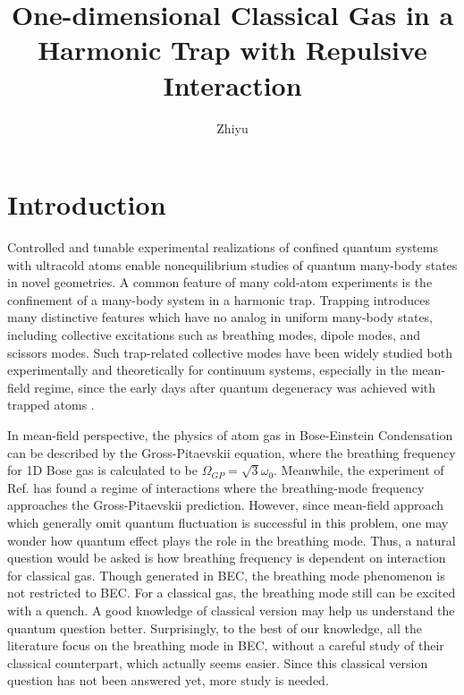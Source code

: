 \documentclass[aps,pre,twocolumn,groupedaddress]{revtex4-1}
\begin{document}
 \title{One-dimensional Classical Gas in a Harmonic Trap with Repulsive Interaction}
 \author{Zhiyu}
 
 
\begin{abstract}
\end{abstract}
 \maketitle
\section{Introduction}
Controlled and tunable experimental realizations of confined quantum systems with ultracold atoms enable nonequilibrium studies of quantum many-body states in novel geometries. A common feature of many cold-atom experiments is the confinement of a many-body system in a harmonic trap. Trapping introduces many distinctive features which have no analog in uniform many-body states, including collective excitations such as breathing modes, dipole modes, and scissors modes. Such trap-related collective modes have been widely studied both experimentally and theoretically for continuum systems, especially in the mean-field regime, since the early days after quantum degeneracy was achieved with trapped atoms \cite{Dalfovo1997}\cite{Jin1996}.

In mean-field perspective, the physics of atom gas in Bose-Einstein Condensation can be described by the Gross-Pitaevskii equation\cite{Dalfovo1999}\cite{Stringari1996}, where the breathing frequency for 1D Bose gas is calculated to be $\Omega_{GP}=\sqrt{3}\omega_0$. Meanwhile, the experiment of Ref.\cite{Haller2009} has found a regime of interactions where the breathing-mode frequency approaches the Gross-Pitaevskii prediction. However, since mean-field approach which generally omit quantum fluctuation is successful in this problem, one may wonder how quantum effect plays the role in the breathing mode. Thus, a natural question would be asked is how breathing frequency is dependent on interaction for classical gas. Though generated in BEC, the breathing mode phenomenon is not restricted to BEC. For a classical gas, the breathing mode still can be excited with a quench. A good knowledge of classical version may help us understand the quantum question better. Surprisingly,  to the best of our knowledge, all the literature focus on the breathing mode in BEC, without a careful study of their classical counterpart, which actually seems easier. Since this classical version question has not been answered yet, more study is needed.
\end{document}
